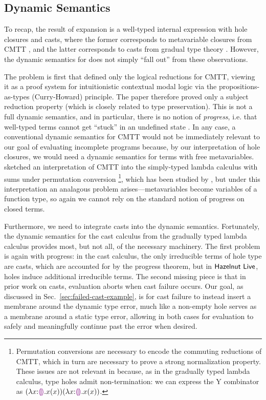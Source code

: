 \subsection{Dynamic Semantics}
\label{sec:evaluation}

To recap, the result of expansion is a well-typed internal expression with hole closures and casts, 
where the former corresponds to metavariable closures from CMTT \cite{Nanevski2008}, 
and the latter corresponds to casts from gradual type theory \cite{Siek06a,DBLP:conf/snapl/SiekVCB15}. 
However, the dynamic semantics for \HazelnutLive does not simply ``fall out'' from these observations. 

The problem is first that \citet{Nanevski2008} defined only the logical reductions for CMTT, viewing it as a proof system for intuitionistic contextual modal logic via the propositions-as-types (Curry-Howard) principle. 
The paper therefore proved only a subject reduction property (which is closely related to type preservation). 
This is not a full dynamic semantics, and in particular, there is no notion of \emph{progress}, i.e. that well-typed terms cannot get ``stuck'' in an undefined state \cite{wright94:_type_soundness}. 
In any case, a conventional dynamic semantics for CMTT would not be immediately relevant to our goal of evaluating incomplete programs because, by our interpretation of hole closures, we would need a dynamic semantics for terms with free metavariables. 
\citet{Nanevski2008} sketched an interpretation of CMTT into the simply-typed lambda calculus with sums under permutation conversion%
\footnote{Permutation conversions are necessary to encode the commuting reductions of CMTT, which in turn are necessary to prove a strong normalization property. These issues are not relevant in \HazelnutLive because, as in the gradually typed lambda calculus, type holes admit non-termination: we can express the Y combinator as $(\lambda x{:}\textcolor{violet}{\llparenthesis}\textcolor{violet}{\rrparenthesis}.x(x)) (\lambda x{:}\textcolor{violet}{\llparenthesis}\textcolor{violet}{\rrparenthesis}.x(x))$.}, 
which has been studied by \citet{DBLP:journals/iandc/Groote02}, 
but under this interpretation an analagous problem arises---metavariables become variables of a function type, so again we cannot rely on the standard notion of progress on closed terms.%

Furthermore, we need to integrate casts into the dynamic semantics. 
Fortunately, the dynamic semantics for the cast calculus from the gradually typed lambda calculus provides most, but not all, of the necessary machinery. 
The first problem is again with progress: in the cast calculus, the only irreducible terms of hole type are casts, which are accounted for by the progress theorem, but in $\textsf{Hazelnut Live}$, holes induce additional irreducible terms. 
The second missing piece is that in prior work on casts, evaluation aborts when cast failure occurs. 
Our goal, as discussed in Sec.~\ref{sec:failed-cast-example}, is for cast failure to instead insert a membrane around the dynamic type error, 
much like a non-empty hole serves as a membrane around a static type error, 
allowing in both cases for evaluation to safely and meaningfully continue past the error when desired.

